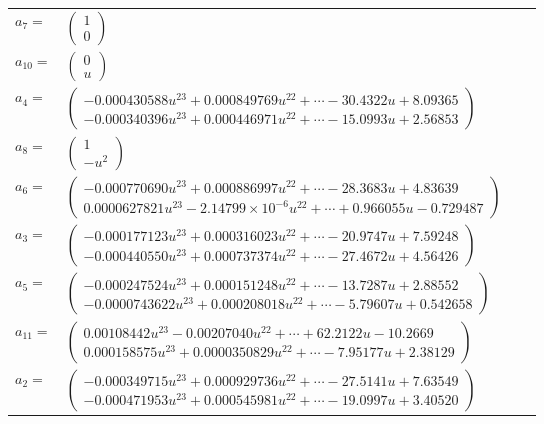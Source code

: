 \documentclass[1p]{elsarticle_modified}
\theoremstyle{definition}
\begin{document}
\begin{tabular}{m{7pt} m{180pt} m{7pt} m{180pt} }
\flushright $a_{7}=$&$\begin{pmatrix}1\\0\end{pmatrix}$ \\
\flushright $a_{10}=$&$\begin{pmatrix}0\\u\end{pmatrix}$ \\
\flushright $a_{4}=$&$\begin{pmatrix}-0.000430588 u^{23}+0.000849769 u^{22}+\cdots-30.4322 u+8.09365\\-0.000340396 u^{23}+0.000446971 u^{22}+\cdots-15.0993 u+2.56853\end{pmatrix}$ \\
\flushright $a_{8}=$&$\begin{pmatrix}1\\- u^2\end{pmatrix}$ \\
\flushright $a_{6}=$&$\begin{pmatrix}-0.000770690 u^{23}+0.000886997 u^{22}+\cdots-28.3683 u+4.83639\\0.0000627821 u^{23}-2.14799\times10^{-6} u^{22}+\cdots+0.966055 u-0.729487\end{pmatrix}$ \\
\flushright $a_{3}=$&$\begin{pmatrix}-0.000177123 u^{23}+0.000316023 u^{22}+\cdots-20.9747 u+7.59248\\-0.000440550 u^{23}+0.000737374 u^{22}+\cdots-27.4672 u+4.56426\end{pmatrix}$ \\
\flushright $a_{5}=$&$\begin{pmatrix}-0.000247524 u^{23}+0.000151248 u^{22}+\cdots-13.7287 u+2.88552\\-0.0000743622 u^{23}+0.000208018 u^{22}+\cdots-5.79607 u+0.542658\end{pmatrix}$ \\
\flushright $a_{11}=$&$\begin{pmatrix}0.00108442 u^{23}-0.00207040 u^{22}+\cdots+62.2122 u-10.2669\\0.000158575 u^{23}+0.0000350829 u^{22}+\cdots-7.95177 u+2.38129\end{pmatrix}$ \\
\flushright $a_{2}=$&$\begin{pmatrix}-0.000349715 u^{23}+0.000929736 u^{22}+\cdots-27.5141 u+7.63549\\-0.000471953 u^{23}+0.000545981 u^{22}+\cdots-19.0997 u+3.40520\end{pmatrix}$ \\

\end{tabular}
\end{document}
